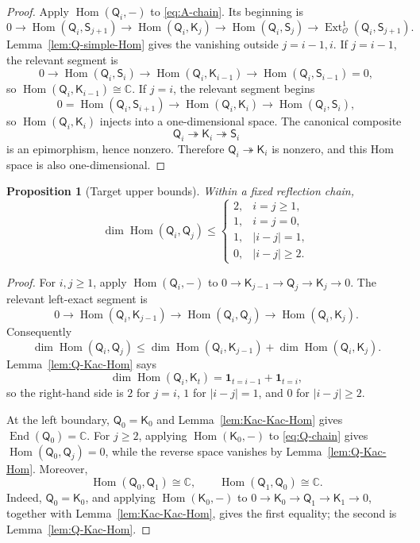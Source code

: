 \documentclass[12pt,leqno]{amsart}
\numberwithin{equation}{section}
\newtheorem{prop}[thm]{Proposition}
\newcommand{\End}{\operatorname{End}}
\newcommand{\Hom}{\operatorname{Hom}}
\newcommand{\Ext}{\operatorname{Ext}}
\newcommand{\Oc}{\mathcal O}
\def\C{\mathbb{C}}
\begin{document}
\begin{proof}
Apply $\Hom(\mathsf Q_i,-)$ to \eqref{eq:A-chain}.  Its beginning is
\[
 0\to\Hom(\mathsf Q_i,\mathsf S_{j+1})
 \to\Hom(\mathsf Q_i,\mathsf K_j)
 \to\Hom(\mathsf Q_i,\mathsf S_j)
 \to\Ext^1_{\Oc}(\mathsf Q_i,\mathsf S_{j+1}).
\]
Lemma~\ref{lem:Q-simple-Hom} gives the vanishing outside $j=i-1,i$.
If $j=i-1$, the relevant segment is
\[
 0\to\Hom(\mathsf Q_i,\mathsf S_i)
 \to\Hom(\mathsf Q_i,\mathsf K_{i-1})
 \to\Hom(\mathsf Q_i,\mathsf S_{i-1})=0,
\]
so $\Hom(\mathsf Q_i,\mathsf K_{i-1})\cong\C$.  If $j=i$, the relevant
segment begins
\[
 0=\Hom(\mathsf Q_i,\mathsf S_{i+1})
 \to\Hom(\mathsf Q_i,\mathsf K_i)
 \to\Hom(\mathsf Q_i,\mathsf S_i),
\]
so $\Hom(\mathsf Q_i,\mathsf K_i)$ injects into a one-dimensional space.  The canonical composite
\[
 \mathsf Q_i\twoheadrightarrow\mathsf K_i
 \twoheadrightarrow\mathsf S_i
\]
is an epimorphism, hence nonzero.  Therefore
$\mathsf Q_i\twoheadrightarrow\mathsf K_i$ is nonzero, and this Hom
space is also one-dimensional.
\end{proof}

\begin{prop}[Target upper bounds]\label{prop:target-Hom-upper}
Within a fixed reflection chain,
\[
 \dim\Hom(\mathsf Q_i,\mathsf Q_j)\le
 \begin{cases}
  2,&i=j\geq1,\\
  1,&i=j=0,\\
  1,&|i-j|=1,\\
  0,&|i-j|\geq2.
 \end{cases}
\]
\end{prop}

\begin{proof}
For $i,j\ge1$, apply $\Hom(\mathsf Q_i,-)$ to
$0\to\mathsf K_{j-1}\to\mathsf Q_j\to\mathsf K_j\to0$.  The
relevant left-exact segment is
\[
 0\longrightarrow\Hom(\mathsf Q_i,\mathsf K_{j-1})
 \longrightarrow\Hom(\mathsf Q_i,\mathsf Q_j)
 \longrightarrow\Hom(\mathsf Q_i,\mathsf K_j).
\]
Consequently
\[
 \dim\Hom(\mathsf Q_i,\mathsf Q_j)
 \le
 \dim\Hom(\mathsf Q_i,\mathsf K_{j-1})
 +\dim\Hom(\mathsf Q_i,\mathsf K_j).
\]
Lemma~\ref{lem:Q-Kac-Hom} says
\[
 \dim\Hom(\mathsf Q_i,\mathsf K_t)
 =\mathbf1_{t=i-1}+\mathbf1_{t=i},
\]
so the right-hand side is $2$ for $j=i$, $1$ for $|i-j|=1$, and $0$
for $|i-j|\ge2$.

At the left boundary, $\mathsf Q_0=\mathsf K_0$ and
Lemma~\ref{lem:Kac-Kac-Hom} gives $\End(\mathsf Q_0)=\C$.  For $j\ge2$,
applying $\Hom(\mathsf K_0,-)$ to \eqref{eq:Q-chain} gives
$\Hom(\mathsf Q_0,\mathsf Q_j)=0$, while the reverse space vanishes by
Lemma~\ref{lem:Q-Kac-Hom}.  Moreover,
\[
 \Hom(\mathsf Q_0,\mathsf Q_1)\cong\C,
 \qquad
 \Hom(\mathsf Q_1,\mathsf Q_0)\cong\C.
\]
Indeed, $\mathsf Q_0=\mathsf K_0$, and applying
$\Hom(\mathsf K_0,-)$ to
$0\to\mathsf K_0\to\mathsf Q_1\to\mathsf K_1\to0$, together with
Lemma~\ref{lem:Kac-Kac-Hom}, gives the first equality; the second is
Lemma~\ref{lem:Q-Kac-Hom}.
\end{proof}
\end{document}
